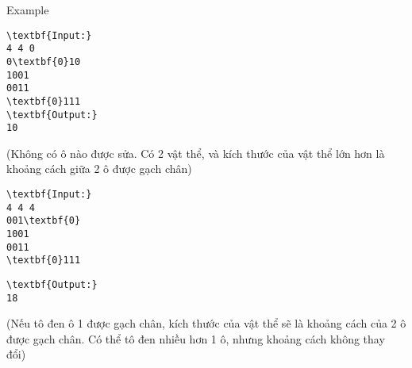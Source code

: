 Example
\begin{verbatim}
\textbf{Input:}
4 4 0
0\textbf{0}10
1001
0011
\textbf{0}111
\textbf{Output:}
10\end{verbatim}

(Không có ô nào được sửa. Có 2 vật thể, và kích thước của vật thể lớn hơn là khoảng cách giữa 2 ô được gạch chân)
\begin{verbatim}
\textbf{Input:}
4 4 4
001\textbf{0}
1001
0011
\textbf{0}111\end{verbatim}
\begin{verbatim}
\textbf{Output:}
18\end{verbatim}

(Nếu tô đen ô 1 được gạch chân, kích thước của vật thể sẽ là khoảng cách của 2 ô được gạch chân. Có thể tô đen nhiều hơn 1 ô, nhưng khoảng cách không thay đổi)
